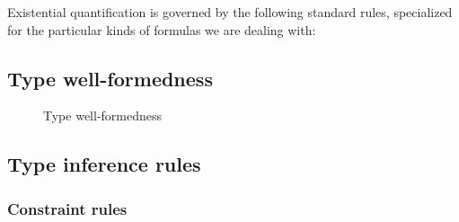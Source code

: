 \documentclass[preprint,nocopyrightspace,9pt]{sigplanconf}
\begin{document}
{





Existential quantification is governed by the following standard rules,
specialized for the particular kinds of formulas we are dealing with:







}

\subsection{
Type well-formedness
}

\begin{figure}





\caption{Type well-formedness}
\label{fig:type-wf}
\end{figure}

\subsection{
      Type inference rules
}

\subsubsection{Constraint rules}
\end{document}
